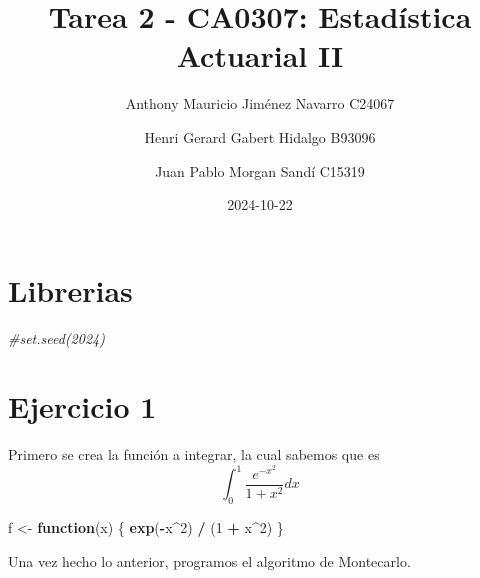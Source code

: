 \documentclass[
]{article}
\title{Tarea 2 - CA0307: Estadística Actuarial II}
\author{Anthony Mauricio Jiménez Navarro \textbar{} C24067 \and Henri
Gerard Gabert Hidalgo \textbar{} B93096 \and Juan Pablo Morgan Sandí
\textbar{} C15319}
\date{2024-10-22}
\newenvironment{Shaded}{\begin{snugshade}}{\end{snugshade}}
\newcommand{\CommentTok}[1]{\textcolor[rgb]{0.56,0.35,0.01}{\textit{#1}}}
\newcommand{\ControlFlowTok}[1]{\textcolor[rgb]{0.13,0.29,0.53}{\textbf{#1}}}
\newcommand{\DecValTok}[1]{\textcolor[rgb]{0.00,0.00,0.81}{#1}}
\newcommand{\FunctionTok}[1]{\textcolor[rgb]{0.13,0.29,0.53}{\textbf{#1}}}
\newcommand{\NormalTok}[1]{#1}
\newcommand{\OtherTok}[1]{\textcolor[rgb]{0.56,0.35,0.01}{#1}}
\newcommand{\SpecialCharTok}[1]{\textcolor[rgb]{0.81,0.36,0.00}{\textbf{#1}}}
\begin{document}
\maketitle

{
\setcounter{tocdepth}{2}
\tableofcontents
}
\hypertarget{librerias}{%
\section{Librerias}\label{librerias}}

\begin{Shaded}
\begin{Highlighting}[]
\CommentTok{\#set.seed(2024)}
\end{Highlighting}
\end{Shaded}

\hypertarget{ejercicio-1}{%
\section{Ejercicio 1}\label{ejercicio-1}}

Primero se crea la función a integrar, la cual sabemos que es \[
\int_0^1 \frac{e^{-x^2}}{1+x^2} d x
\]

\begin{Shaded}
\begin{Highlighting}[]
\NormalTok{f }\OtherTok{\textless{}{-}} \ControlFlowTok{function}\NormalTok{(x) \{}
  \FunctionTok{exp}\NormalTok{(}\SpecialCharTok{{-}}\NormalTok{x}\SpecialCharTok{\^{}}\DecValTok{2}\NormalTok{) }\SpecialCharTok{/}\NormalTok{ (}\DecValTok{1} \SpecialCharTok{+}\NormalTok{ x}\SpecialCharTok{\^{}}\DecValTok{2}\NormalTok{)}
\NormalTok{\}}
\end{Highlighting}
\end{Shaded}

Una vez hecho lo anterior, programos el algoritmo de Montecarlo.
\end{document}
